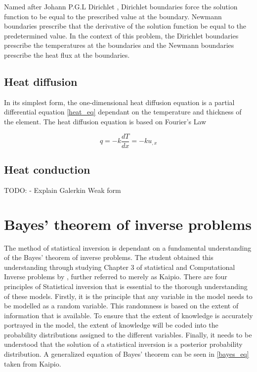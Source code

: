 	Named after Johann P.G.L Dirichlet \citep{Cheng:2005}, Dirichlet boundaries force the solution function to be equal to the prescribed value at the boundary. 
	Newmann boundaries prescribe that the derivative of the solution function be equal to the predetermined value. 
	In the context of this problem, the Dirichlet boundaries prescribe the temperatures at the boundaries and the Newmann boundaries prescribe the heat flux at the boundaries.
	


	\subsection{Heat diffusion}	 
	 In its simplest form, the one-dimensional heat diffusion equation is a partial differential equation \ref{heat_eq} dependant on the temperature and thickness of the element. 
	The heat diffusion equation is based on Fourier's Law 
	
	
	\begin{equation}
	\label{heat_eq}
		q = -k \frac{dT}{dx} = -k u_{,x}
	\end{equation}
	\subsection{Heat conduction}
	TODO: - Explain Galerkin Weak form
	
	
\section{Bayes' theorem of inverse problems}
	The method of statistical inversion is dependant on a fundamental understanding of the Bayes' theorem of inverse problems. 
	The student obtained this understanding through studying Chapter 3 of statistical and Computational Inverse problems by \citet{Kaipo:2005}, further referred to merely as Kaipio. 
	There are four principles of Statistical inversion that is essential to the thorough understanding of these models. 
	Firstly, it is the principle that any variable in the model needs to be modelled as a random variable. 
	This randomness is based on the extent of information that is available. 
	To ensure that the extent of knowledge is accurately portrayed in the model, the extent of knowledge will be coded into the probability distributions assigned to the different variables. 
	Finally, it needs to be understood that the solution of a statistical inversion is a posterior probability distribution.
	A generalized equation of Bayes' theorem can be seen in \ref{bayes_eq} taken from Kaipio. 
	
